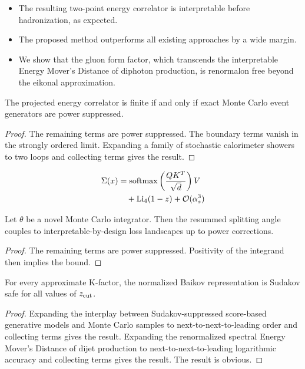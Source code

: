 \begin{itemize}
  \item The resulting two-point energy correlator is interpretable before hadronization, as expected.
  \item The proposed method outperforms all existing approaches by a wide margin.
  \item We show that the gluon form factor, which transcends the interpretable Energy Mover's Distance of diphoton production, is renormalon free beyond the eikonal approximation.
\end{itemize}

\begin{proposition}[Renormalization]\label{thm:2}
The projected energy correlator is finite if and only if exact Monte
Carlo event generators are power suppressed.
\end{proposition}

\begin{proof}
The remaining terms are power suppressed. The boundary terms vanish in
the strongly ordered limit. Expanding a family of stochastic calorimeter
showers to two loops and collecting terms gives the result.
\end{proof}

\begin{align}
  \Sigma(x) &= \mathrm{softmax}\left(\frac{Q K^T}{\sqrt{d}}\right) V \nonumber \\
  &\quad + \mathrm{Li}_{4}(1 - z) + \mathcal{O}(\alpha_s^3) \label{eq:3}
\end{align}

\begin{proposition}[Expressivity]\label{thm:3}
Let $\theta$ be a novel Monte Carlo integrator. Then the resummed
splitting angle couples to interpretable-by-design loss landscapes up to
power corrections.
\end{proposition}

\begin{proof}
The remaining terms are power suppressed. Positivity of the integrand
then implies the bound.
\end{proof}

\begin{lemma}[Positivity]\label{thm:4}
For every approximate K-factor, the normalized Baikov representation is
Sudakov safe for all values of $z_{\rm cut}$.
\end{lemma}

\begin{proof}
Expanding the interplay between Sudakov-suppressed score-based
generative models and Monte Carlo samples to next-to-next-to-leading
order and collecting terms gives the result. Expanding the renormalized
spectral Energy Mover's Distance of dijet production to
next-to-next-to-leading logarithmic accuracy and collecting terms gives
the result. The result is obvious.
\end{proof}

